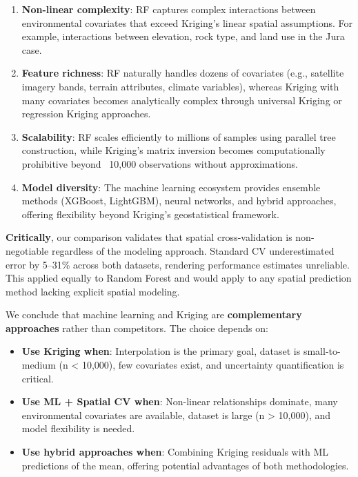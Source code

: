\documentclass[a4paper,fleqn]{cas-sc}
\begin{document}
\begin{enumerate}
\item \textbf{Non-linear complexity}: RF captures complex interactions between environmental covariates that exceed Kriging's linear spatial assumptions. For example, interactions between elevation, rock type, and land use in the Jura case.

\item \textbf{Feature richness}: RF naturally handles dozens of covariates (e.g., satellite imagery bands, terrain attributes, climate variables), whereas Kriging with many covariates becomes analytically complex through universal Kriging or regression Kriging approaches.

\item \textbf{Scalability}: RF scales efficiently to millions of samples using parallel tree construction, while Kriging's matrix inversion becomes computationally prohibitive beyond ~10,000 observations without approximations.

\item \textbf{Model diversity}: The machine learning ecosystem provides ensemble methods (XGBoost, LightGBM), neural networks, and hybrid approaches, offering flexibility beyond Kriging's geostatistical framework.
\end{enumerate}

\textbf{Critically}, our comparison validates that spatial cross-validation is non-negotiable regardless of the modeling approach. Standard CV underestimated error by 5--31\% across both datasets, rendering performance estimates unreliable. This applied equally to Random Forest and would apply to any spatial prediction method lacking explicit spatial modeling.

We conclude that machine learning and Kriging are \textbf{complementary approaches} rather than competitors. The choice depends on:
\begin{itemize}
\item \textbf{Use Kriging when}: Interpolation is the primary goal, dataset is small-to-medium (n < 10,000), few covariates exist, and uncertainty quantification is critical.
\item \textbf{Use ML + Spatial CV when}: Non-linear relationships dominate, many environmental covariates are available, dataset is large (n > 10,000), and model flexibility is needed.
\item \textbf{Use hybrid approaches when}: Combining Kriging residuals with ML predictions of the mean, offering potential advantages of both methodologies.
\end{itemize}
\end{document}
